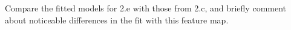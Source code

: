 \item {}

Compare the fitted models for 2.e with those from 2.c, and briefly comment about noticeable differences in the fit with this feature map.

